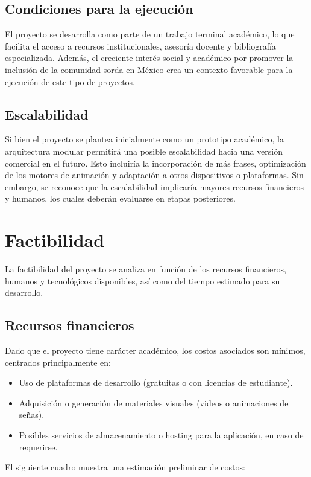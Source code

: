 \subsection{Condiciones para la ejecución}
El proyecto se desarrolla como parte de un trabajo terminal académico, lo que facilita el acceso a recursos institucionales, asesoría docente y bibliografía especializada. Además, el creciente interés social y académico por promover la inclusión de la comunidad sorda en México crea un contexto favorable para la ejecución de este tipo de proyectos.

\subsection{Escalabilidad}
Si bien el proyecto se plantea inicialmente como un prototipo académico, la arquitectura modular permitirá una posible escalabilidad hacia una versión comercial en el futuro. Esto incluiría la incorporación de más frases, optimización de los motores de animación y adaptación a otros dispositivos o plataformas. Sin embargo, se reconoce que la escalabilidad implicaría mayores recursos financieros y humanos, los cuales deberán evaluarse en etapas posteriores.

\section{Factibilidad}
La factibilidad del proyecto se analiza en función de los recursos financieros, humanos y tecnológicos disponibles, así como del tiempo estimado para su desarrollo.

\subsection{Recursos financieros}
Dado que el proyecto tiene carácter académico, los costos asociados son mínimos, centrados principalmente en:
\begin{itemize}
	\item Uso de plataformas de desarrollo (gratuitas o con licencias de estudiante).
	\item Adquisición o generación de materiales visuales (videos o animaciones de señas).
	\item Posibles servicios de almacenamiento o hosting para la aplicación, en caso de requerirse.
\end{itemize}

El siguiente cuadro muestra una estimación preliminar de costos:

